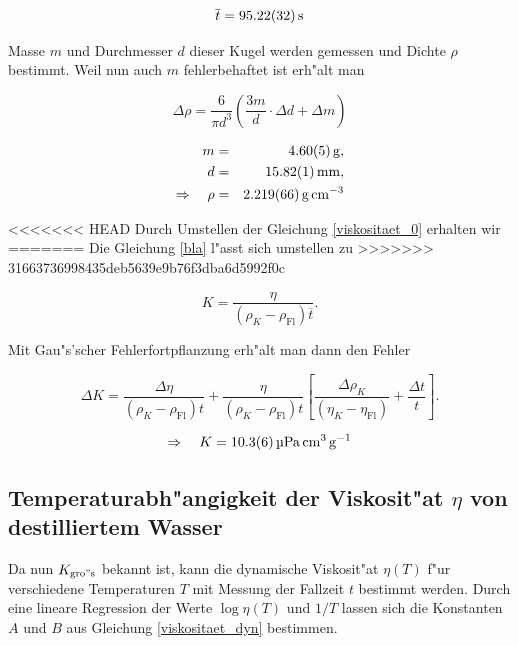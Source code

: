 		\begin{equation*}
			\overline{t} = \SI{95.22 (32)}{\second}
		\end{equation*}

		Masse $m$ und Durchmesser $d$ dieser Kugel werden gemessen und Dichte $\rho$ bestimmt.
		Weil nun auch $m$ fehlerbehaftet ist erh"alt man

		\begin{equation*}
			\Delta \rho = \frac{6}{\pi d^3} \left( \frac{3 m}{d} \cdot \Delta d + \Delta m \right)
		\end{equation*}

		\begin{eqnarray*}
				m & = & \SI{4.60 (5)}{\gram} , \\
				d & = & \SI{15.82 (1)}{\milli \meter} , \\
				\Rightarrow \quad \rho & = & \SI{2.219 (66)}{\gram \per \centi \meter \cubed}
		\end{eqnarray*}

<<<<<<< HEAD
		Durch Umstellen der Gleichung \eqref{viskositaet_0} erhalten wir
=======
		Die Gleichung \eqref{bla} l"asst sich umstellen zu
>>>>>>> 31663736998435deb5639e9b76f3dba6d5992f0c

		\begin{equation}
			K = \frac{\eta}{\left(\rho_K - \rho_\mathrm{Fl}\right) \overline{t}} .
		\end{equation}

		Mit Gau"s'scher Fehlerfortpflanzung erh"alt man dann den Fehler

		\begin{equation*}
			\Delta K = \frac{\Delta \eta}{\left(\rho_K - \rho_\mathrm{Fl}\right) t} + \frac{\eta}{\left(\rho_K - \rho_\mathrm{Fl}\right) t} \left[ \frac{\Delta \rho_K}{\left( \eta_K - \eta_\mathrm{Fl} \right)} + \frac{\Delta t}{t} \right] .
		\end{equation*}

		\begin{equation*}
			\Rightarrow \quad K = \SI{10.3 (6)}{\micro \pascal \centi \meter \cubed \per \gram}
		\end{equation*}

	\subsection{Temperaturabh"angigkeit der Viskosit"at $\eta$ von destilliertem Wasser}
		\label{sub:temperaturabhaengigkeit}

		Da nun $K_\mathrm{gro"s}$ bekannt ist, kann die dynamische Viskosit"at $\eta (T)$ f"ur verschiedene Tem\-pe\-ra\-tu\-ren $T$ mit Messung der Fallzeit $t$ bestimmt werden.
		Durch eine lineare Regression der Werte $\log{\eta (T)}$ und $1 / T$ lassen sich die Konstanten $A$ und $B$ aus Gleichung \eqref{viskositaet_dyn} bestimmen.

